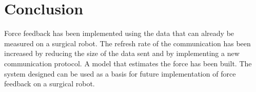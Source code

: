 \section{Conclusion}

 Force feedback has been implemented using the data that can already be measured on a surgical robot. The refresh rate of the communication has been increased by reducing the size of the data sent and by implementing a new communication protocol. A model that estimates the force has been built. The system designed can be used as a basis for future implementation of force feedback on a surgical robot.
 

